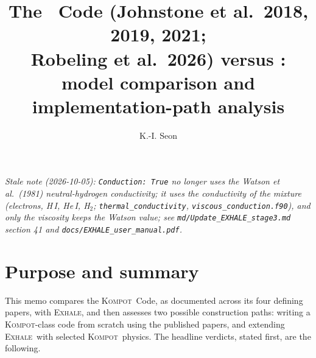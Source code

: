 \documentclass{my_memo}
\title{The \Kompot\ Code (Johnstone et al.\ 2018, 2019, 2021;\\
Robeling et al.\ 2026) versus \EXHALE:\\
model comparison and implementation-path analysis}
\author{K.-I. Seon}
\date{\docmoddate}
\newcommand{\EXHALE}{\textsc{Exhale}}
\newcommand{\Kompot}{\textsc{Kompot}}
\begin{document}
\maketitle

\noindent\textit{Stale note (2026-10-05): \texttt{Conduction: True} no longer uses the Watson et al.\ (1981) neutral-hydrogen conductivity; it uses the conductivity of the mixture (electrons, H\,I, He\,I, H$_2$; \texttt{thermal\_conductivity}, \texttt{viscous\_conduction.f90}), and only the viscosity keeps the Watson value; see \texttt{md/Update\_EXHALE\_stage3.md} section 41 and \texttt{docs/EXHALE\_user\_manual.pdf}.}

\section{Purpose and summary}

This memo compares the \Kompot\ Code, as documented across its four defining papers, with
\EXHALE, and then assesses two possible construction paths: writing a \Kompot-class code from
scratch using the published papers, and extending \EXHALE\ with selected \Kompot\ physics. The
headline verdicts, stated first, are the following.
\end{document}
